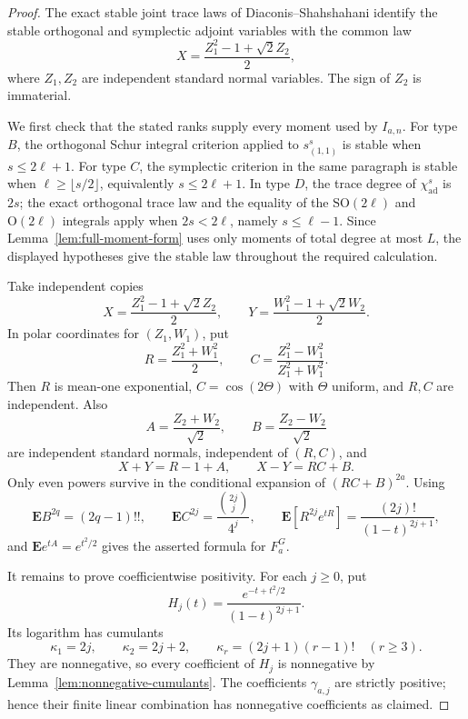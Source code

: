 \documentclass[11pt,reqno]{amsart}
\theoremstyle{plain}
\theoremstyle{definition}
\newcommand{\chiad}{\chi_{\mathrm{ad}}}
\begin{document}
\begin{proof}
The exact stable joint trace laws of Diaconis--Shahshahani
\cite[Theorems~4 and~6]{DiaconisShahshahani1994} identify the stable
orthogonal and symplectic adjoint variables with the common law
\[
 X=\frac{Z_1^2-1+\sqrt2Z_2}{2},
\]
where $Z_1,Z_2$ are independent standard normal variables.  The sign of
$Z_2$ is immaterial.

We first check that the stated ranks supply every moment used by
$I_{a,n}$.  For type $B$, the orthogonal Schur integral criterion
\cite[Section~3, paragraph preceding Lemma~3.1]{Rains1997} applied to
$s_{(1,1)}^s$ is stable when $s\leq2\ell+1$.  For type $C$, the
symplectic criterion in the same paragraph is stable when
$\ell\geq\lfloor s/2\rfloor$, equivalently $s\leq2\ell+1$.  In type $D$,
the trace degree of $\chiad^s$ is $2s$; the exact orthogonal trace law and
the equality of the $\mathrm{SO}(2\ell)$ and $\mathrm O(2\ell)$ integrals
apply when $2s<2\ell$, namely $s\leq\ell-1$.  Since
Lemma~\ref{lem:full-moment-form} uses only moments of total degree at most
$L$, the displayed hypotheses give the stable law throughout the required
calculation.

Take independent copies
\[
 X=\frac{Z_1^2-1+\sqrt2Z_2}{2},\qquad
 Y=\frac{W_1^2-1+\sqrt2W_2}{2}.
\]
In polar coordinates for $(Z_1,W_1)$, put
\[
 R=\frac{Z_1^2+W_1^2}{2},\qquad
 C=\frac{Z_1^2-W_1^2}{Z_1^2+W_1^2}.
\]
Then $R$ is mean-one exponential, $C=\cos(2\Theta)$ with $\Theta$ uniform,
and $R,C$ are independent.  Also
\[
 A=\frac{Z_2+W_2}{\sqrt2},\qquad
 B=\frac{Z_2-W_2}{\sqrt2}
\]
are independent standard normals, independent of $(R,C)$, and
\[
 X+Y=R-1+A,\qquad X-Y=RC+B.
\]
Only even powers survive in the conditional expansion of $(RC+B)^{2a}$.
Using
\[
 \mathbf E B^{2q}=(2q-1)!!,
 \qquad
 \mathbf E C^{2j}=\frac{\binom{2j}{j}}{4^j},
 \qquad
 \mathbf E[R^{2j}e^{tR}]=\frac{(2j)!}{(1-t)^{2j+1}},
\]
and $\mathbf E e^{tA}=e^{t^2/2}$ gives the asserted formula for
$F_a^G$.

It remains to prove coefficientwise positivity.  For each $j\geq0$, put
\[
 H_j(t)=\frac{e^{-t+t^2/2}}{(1-t)^{2j+1}}.
\]
Its logarithm has cumulants
\[
 \kappa_1=2j,\qquad
 \kappa_2=2j+2,\qquad
 \kappa_r=(2j+1)(r-1)!\quad(r\geq3).
\]
They are nonnegative, so every coefficient of $H_j$ is nonnegative by
Lemma~\ref{lem:nonnegative-cumulants}.  The coefficients $\gamma_{a,j}$
are strictly positive; hence their finite linear combination has
nonnegative coefficients as claimed.
\end{proof}
\end{document}
